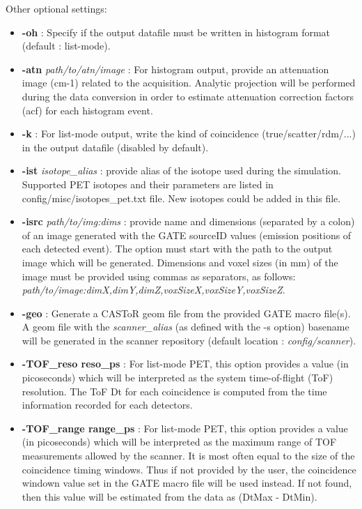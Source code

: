 \documentclass[a4paper, 11pt]{article}
\begin{document}
Other optional settings:
\begin{itemize}
  \item \textbf{-oh} : Specify if the output datafile must be written in histogram format (default : list-mode).
  \item \textbf{-atn} \textit{path/to/atn/image} : For histogram output, provide an attenuation image (cm-1) related to the acquisition.
        Analytic projection will be performed during the data conversion in order to estimate attenuation correction factors (acf) for
        each histogram event.       
  \item \textbf{-k} : For list-mode output, write the kind of coincidence (true/scatter/rdm/...) in the output datafile (disabled by default).
  \item \textbf{-ist} \textit{isotope\_alias}           : provide alias of the isotope used during the simulation. Supported PET isotopes
        and their parameters are listed in config/misc/isotopes\_pet.txt file. New isotopes could be added in this file.
  \item \textbf{-isrc} \textit{path/to/img:dims}       : provide name and dimensions (separated by a colon) of an image generated with
        the GATE sourceID values (emission positions of each detected event). The option must start with the path to the output image
        which will be generated. Dimensions and voxel sizes (in mm) of the image must be provided using commas as separators, as follows:
        \textit{path/to/image:dimX,dimY,dimZ,voxSizeX,voxSizeY,voxSizeZ}.
  \item \textbf{-geo}                       : Generate a CASToR geom file from the provided GATE macro file(s). A geom file with the
        \textit{scanner\_alias} (as defined with the -s option) basename will be generated in the scanner repository (default location : \textit{config/scanner}).
  \item \textbf{-TOF\_reso reso\_ps} : For list-mode PET, this option provides a value (in picoseconds) which will be interpreted as the system time-of-flight (ToF) resolution. The ToF Dt for each coincidence is computed from the time information recorded for each detectors.
  \item \textbf{-TOF\_range range\_ps} : For list-mode PET, this option provides a value (in picoseconds) which will be interpreted as the maximum range of TOF measurements allowed by the scanner. It is most often equal to the size of the coincidence timing windows. Thus if not provided by the user, the coincidence windown value set in the GATE macro file will be used instead. If not found, then this value will be estimated from the data as (DtMax - DtMin).

\end{itemize}
\end{document}
